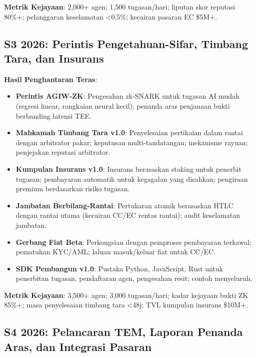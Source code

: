\documentclass[11pt]{article}
\begin{document}
\textbf{Metrik Kejayaan}: 2,000+ agen; 1,500 tugasan/hari; liputan skor reputasi 80\%+; pelanggaran keselamatan <0.5\%; kecairan pasaran EC \$5M+.

\subsection{S3 2026: Perintis Pengetahuan-Sifar, Timbang Tara, dan Insurans}

\textbf{Hasil Penghantaran Teras}:
\begin{itemize}[noitemsep]
  \item \textbf{Perintis AGIW-ZK}: Pengesahan zk-SNARK untuk tugasan AI mudah (regresi linear, rangkaian neural kecil); penanda aras penjanaan bukti berbanding latensi TEE.
  \item \textbf{Mahkamah Timbang Tara v1.0}: Penyelesaian pertikaian dalam rantai dengan arbitrator pakar; keputusan multi-tandatangan; mekanisme rayuan; penjejakan reputasi arbitrator.
  \item \textbf{Kumpulan Insurans v1.0}: Insurans berasaskan staking untuk penerbit tugasan; pembayaran automatik untuk kegagalan yang disahkan; pengiraan premium berdasarkan risiko tugasan.
  \item \textbf{Jambatan Berbilang-Rantai}: Pertukaran atomik berasaskan HTLC dengan rantai utama (kecairan CC/EC rentas rantai); audit keselamatan jambatan.
  \item \textbf{Gerbang Fiat Beta}: Perkongsian dengan pemproses pembayaran terkawal; pematuhan KYC/AML; laluan masuk/keluar fiat untuk CC/EC.
  \item \textbf{SDK Pembangun v1.0}: Pustaka Python, JavaScript, Rust untuk penerbitan tugasan, pendaftaran agen, pengesahan resit; contoh menyeluruh.
\end{itemize}

\textbf{Metrik Kejayaan}: 3,500+ agen; 3,000 tugasan/hari; kadar kejayaan bukti ZK 85\%+; masa penyelesaian timbang tara <48j; TVL kumpulan insurans \$10M+.

\subsection{S4 2026: Pelancaran TEM, Laporan Penanda Aras, dan Integrasi Pasaran}
\end{document}
